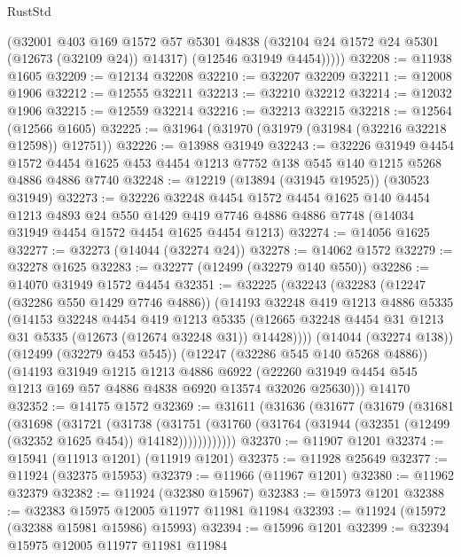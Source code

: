 \begin{lexlean}{RustStd}
\begin{coremodule}
{\begin{coremodule}
{{{{{{{{{{{{{{{{{{{{{{{{{{{{{{{{{{{{{{{{{{{{{{{{{{{{{{{{{{{{{{{{{{{{{{{{{{{{{{{{          (@32001
            @403
            @169
            @1572
            @57
            @5301
            @4838
            (@32104 @24 @1572 @24 @5301 (@12673 (@32109 @24)) @14317)
            (@12546 @31949 @4454)))))
@32208 := @11938 @1605
@32209 := @12134 @32208
@32210 := @32207 @32209
@32211 := @12008 @1906
@32212 := @12555 @32211
@32213 := @32210 @32212
@32214 := @12032 @1906
@32215 := @12559 @32214
@32216 := @32213 @32215
@32218 := @12564 (@12566 @1605)
@32225 := @31964 (@31970 (@31979 (@31984 (@32216 @32218 @12598)) @12751))
@32226 := @13988 @31949
@32243 := @32226
    @31949
    @4454
    @1572
    @4454
    @1625
    @453
    @4454
    @1213
    @7752
    @138
    @545
    @140
    @1215
    @5268
    @4886
    @4886
    @7740
@32248 := @12219 (@13894 (@31945 @19525)) (@30523 @31949)
@32273 := @32226
    @32248
    @4454
    @1572
    @4454
    @1625
    @140
    @4454
    @1213
    @4893
    @24
    @550
    @1429
    @419
    @7746
    @4886
    @4886
    @7748
    (@14034 @31949 @4454 @1572 @4454 @1625 @4454 @1213)
@32274 := @14056 @1625
@32277 := @32273 (@14044 (@32274 @24))
@32278 := @14062 @1572
@32279 := @32278 @1625
@32283 := @32277 (@12499 (@32279 @140 @550))
@32286 := @14070 @31949 @1572 @4454
@32351 := @32225
    (@32243
      (@32283
        (@12247 (@32286 @550 @1429 @7746 @4886))
        (@14193
          @32248
          @419
          @1213
          @4886
          @5335
          (@14153
            @32248
            @4454
            @419
            @1213
            @5335
            (@12665 @32248 @4454 @31 @1213 @31 @5335 (@12673 (@12674 @32248 @31)) @14428))))
      (@14044 (@32274 @138))
      (@12499 (@32279 @453 @545))
      (@12247 (@32286 @545 @140 @5268 @4886))
      (@14193
        @31949
        @1215
        @1213
        @4886
        @6922
        (@22260 @31949 @4454 @545 @1213 @169 @57 @4886 @4838 @6920 @13574 @32026 @25630)))
    @14170
@32352 := @14175 @1572
@32369 := @31611
    (@31636
      (@31677
        (@31679
          (@31681
            (@31698
              (@31721
                (@31738
                  (@31751
                    (@31760 (@31764 (@31944 (@32351 (@12499 (@32352 @1625 @454)) @14182))))))))))))
@32370 := @11907 @1201
@32374 := @15941 (@11913 @1201) (@11919 @1201)
@32375 := @11928 @25649
@32377 := @11924 (@32375 @15953)
@32379 := @11966 (@11967 @1201)
@32380 := @11962 @32379
@32382 := @11924 (@32380 @15967)
@32383 := @15973 @1201
@32388 := @32383 @15975 @12005 @11977 @11981 @11984
@32393 := @11924 (@15972 (@32388 @15981 @15986) @15993)
@32394 := @15996 @1201
@32399 := @32394 @15975 @12005 @11977 @11981 @11984
}}}}}}}}}}}}}}}}}}}}}}}}}}}}}}}}}}}}}}}}}}}}}}}}}}}}}}}}}}}}}}}}}}}}}}}}}}}}}}}}
\end{coremodule}}
\end{coremodule}
\end{lexlean}

